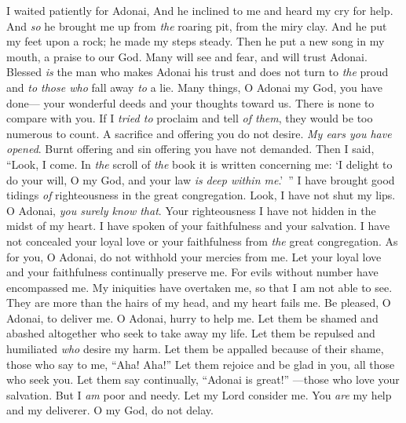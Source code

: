 \begin{biblechapter} %
 I waited patiently for Adonai, 
And he inclined to me 
and heard my cry for help.
\verse And \textit{so} he brought me up from \textit{the} roaring pit, 
from the miry clay. 
And he put my feet upon a rock; 
he made my steps steady.
\verse Then he put a new song in my mouth, 
a praise to our God. 
Many will see and fear, 
and will trust Adonai.
\verse Blessed \textit{is} the man who makes Adonai his trust 
and does not turn to \textit{the} proud and \textit{to those who} fall away \textit{to} a lie.
\verse Many things, O Adonai my God, you have done— 
your wonderful deeds and your thoughts toward us. 
There is none to compare with you. 
If I \textit{tried to} proclaim and tell \textit{of them}, 
they would be too numerous to count.
\verse A sacrifice and offering you do not desire. 
\textit{My ears you have opened}. 
Burnt offering and sin offering you have not demanded.
\verse Then I said, “Look, I come. 
In \textit{the} scroll of \textit{the} book 
it is written concerning me:
\verse ‘I delight to do your will, O my God, 
and your law \textit{is} \textit{deep within me}.’ ”
\verse I have brought good tidings \textit{of} righteousness in the great congregation. 
Look, I have not shut my lips. 
O Adonai, \textit{you surely know that}.
\verse Your righteousness I have not hidden in the midst of my heart. 
I have spoken of your faithfulness and your salvation. 
I have not concealed your loyal love or your faithfulness 
from \textit{the} great congregation.
\verse As for you, O Adonai, do not withhold your mercies from me. 
Let your loyal love and your faithfulness 
continually preserve me.
\verse For evils without number have encompassed me. 
My iniquities have overtaken me, so that I am not able to see. 
They are more than the hairs of my head, 
and my heart fails me.
\verse Be pleased, O Adonai, to deliver me. 
O Adonai, hurry to help me.
\verse Let them be shamed and abashed altogether 
who seek to take away my life. 
Let them be repulsed and humiliated 
\textit{who} desire my harm.
\verse Let them be appalled because of their shame, 
those who say to me, “Aha! Aha!”
\verse Let them rejoice and be glad in you, 
all those who seek you. 
Let them say continually, “Adonai is great!” 
—those who love your salvation.
\verse But I \textit{am} poor and needy. 
Let my Lord consider me. 
You \textit{are} my help and my deliverer. 
O my God, do not delay.
\end{biblechapter}

